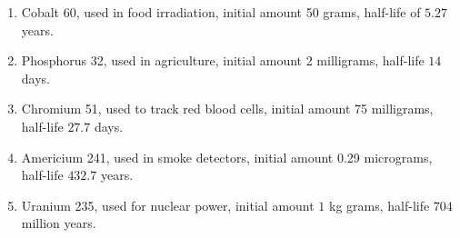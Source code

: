 \begin{enumerate}
\setcounter{enumi}{\value{HW}}

\item  Cobalt 60, used in food irradiation, initial amount 50 grams, half-life of $5.27$ years.  \label{radioactivefirst}

\item  Phosphorus 32, used in agriculture, initial amount 2 milligrams, half-life $14$ days.

\item  Chromium 51, used to track red blood cells, initial amount 75 milligrams, half-life  $27.7$ days.

\item  Americium 241, used in smoke detectors, initial amount 0.29 micrograms, half-life $432.7$ years.

\item  Uranium 235, used for nuclear power, initial amount $1$ kg grams, half-life  $704$ million years. \label{radioactivelast}

\setcounter{HW}{\value{enumi}}
\end{enumerate}

